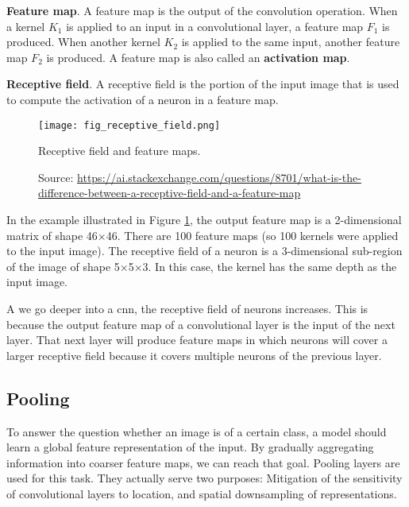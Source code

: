 \textbf{Feature map}. A feature map is the output of the convolution operation. When a kernel $K_1$ is applied to an input in a convolutional layer, a feature map $F_1$ is produced. When another kernel $K_2$ is applied to the same input, another feature map $F_2$ is produced. A feature map is also called an \textbf{activation map}.

\textbf{Receptive field}. A receptive field is the portion of the input image that is used to compute the activation of a neuron in a feature map.

\begin{figure}[ht]
    \begin{center}       
    \texttt{[image: fig\_receptive\_field.png]}
    \caption[Receptive field and feature maps]{Receptive field and feature maps.}
    \caption*{Source: \href{https://ai.stackexchange.com/questions/8701/what-is-the-difference-between-a-receptive-field-and-a-feature-map}{https://ai.stackexchange.com/questions/8701/what-is-the-difference-between-a-receptive-field-and-a-feature-map}}
    \label{fig:receptive_field}
    \end{center}
\end{figure}

In the example illustrated in Figure \ref{fig:receptive_field}, the output feature map is a 2-dimensional matrix of shape 46×46. There are 100 feature maps (so 100 kernels were applied to the input image). The receptive field of a neuron is a 3-dimensional sub-region of the image of shape 5×5×3. In this case, the kernel has the same depth as the input image.

A we go deeper into a \acrshort{cnn}, the receptive field of neurons increases. This is because the output feature map of a convolutional layer is the input of the next layer. That next layer will produce feature maps in which neurons will cover a larger receptive field because it covers multiple neurons of the previous layer.

\subsection{Pooling}
To answer the question whether an image is of a certain class, a model should learn a global feature representation of the input. By gradually aggregating information into coarser feature maps, we can reach that goal. Pooling layers are used for this task. They actually serve two purposes: Mitigation of the sensitivity of convolutional layers to location, and spatial downsampling of representations.

